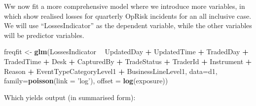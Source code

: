 \documentclass[]{DissertateUSU}
\newenvironment{Shaded}{\begin{snugshade}}{\end{snugshade}}
\newcommand{\KeywordTok}[1]{\textcolor[rgb]{0.13,0.29,0.53}{\textbf{#1}}}
\newcommand{\DataTypeTok}[1]{\textcolor[rgb]{0.13,0.29,0.53}{#1}}
\newcommand{\StringTok}[1]{\textcolor[rgb]{0.31,0.60,0.02}{#1}}
\newcommand{\OperatorTok}[1]{\textcolor[rgb]{0.81,0.36,0.00}{\textbf{#1}}}
\newcommand{\NormalTok}[1]{#1}
\begin{document}
\doublespacing

Ww now fit a more comprehensive model where we introduce more variables,
in which show realised losses for quarterly OpRisk incidents for an all
inclusive case. We will use ``LossesIndicator'' as the dependent
variable, while the other variables will be predictor variables.

\singlespacing

\begin{Shaded}
\begin{Highlighting}[]
\NormalTok{freqfit <-}\StringTok{ }\KeywordTok{glm}\NormalTok{(LossesIndicator }\OperatorTok{~}\StringTok{ }\NormalTok{UpdatedDay }\OperatorTok{+}\StringTok{ }\NormalTok{UpdatedTime }\OperatorTok{+}
\StringTok{                 }\NormalTok{TradedDay }\OperatorTok{+}\StringTok{ }\NormalTok{TradedTime }\OperatorTok{+}\StringTok{ }\NormalTok{Desk }\OperatorTok{+}\StringTok{ }\NormalTok{CapturedBy }\OperatorTok{+}
\StringTok{                 }\NormalTok{TradeStatus }\OperatorTok{+}\StringTok{ }\NormalTok{TraderId }\OperatorTok{+}\StringTok{ }\NormalTok{Instrument }\OperatorTok{+}\StringTok{ }\NormalTok{Reason}
               \OperatorTok{+}\StringTok{ }\NormalTok{EventTypeCategoryLevel1 }\OperatorTok{+}\StringTok{ }\NormalTok{BusinessLineLevel1,}
\DataTypeTok{data=}\NormalTok{d1, }\DataTypeTok{family=}\KeywordTok{poisson}\NormalTok{(}\DataTypeTok{link =} \StringTok{'log'}\NormalTok{), }\DataTypeTok{offset =} \KeywordTok{log}\NormalTok{(exposure))}
\end{Highlighting}
\end{Shaded}

\doublespacing

Which yields output (in summarised form):

\singlespacing
\end{document}
